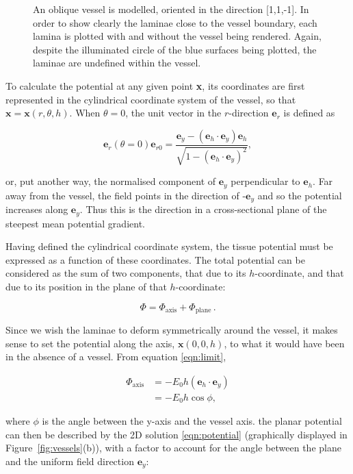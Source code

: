 \begin{figure}[htbp]
    \caption{An oblique vessel is modelled, oriented in the direction [1,1,-1]. In order to show clearly the laminae close to the vessel boundary, each lamina is plotted with and without the vessel being rendered. Again, despite the illuminated circle of the blue surfaces being plotted, the laminae are undefined within the vessel.}
    \label{fig:oblique}
  \end{figure}
  
  To calculate the potential at any given point \textbf{x}, its coordinates are first represented in the cylindrical coordinate system of the vessel, so that $\mathbf{x} = \mathbf{x}(r,\theta,h)$. When $\theta = 0$, the unit vector in the $r$-direction $\mathbf{e}_r$ is defined as
  
  \begin{equation}
    \mathbf{e}_r(\theta = 0) \mathbf{e}_{r0} = \frac{\mathbf{e}_y - (\mathbf{e}_h \cdot \mathbf{e}_y) \mathbf{e}_h}{\sqrt{1 - \left(\mathbf{e}_h \cdot \mathbf{e}_y\right)^2}},
  \end{equation}
  
  or, put another way, the normalised component of $\mathbf{e}_y$ perpendicular to $\mathbf{e}_h$. Far away from the vessel, the field points in the direction of -$\mathbf{e}_y$ and so the potential increases along $\mathbf{e}_y$. Thus this is the direction in a cross-sectional plane of the steepest mean potential gradient.
  
  Having defined the cylindrical coordinate system, the tissue potential must be expressed as a function of these coordinates. The total potential can be considered as the sum of two components, that due to its $h$-coordinate, and that due to its position in the plane of that $h$-coordinate:
  
  \begin{equation}
    \Phi = \Phi_{\text{axis}} + \Phi_{\text{plane}}\,.
  \end{equation}
  
  Since we wish the laminae to deform symmetrically around the vessel, it makes sense to set the potential along the axis, $\mathbf{x}(0,0,h)$, to what it would have been in the absence of a vessel. From equation \ref{eqn:limit},
  
  \begin{align}
    \Phi_{\text{axis}} & = -E_0h(\mathbf{e}_h \cdot \mathbf{e}_y) \\
    & = -E_0h\cos\phi,
  \end{align}
  
  where $\phi$ is the angle between the y-axis and the vessel axis. the planar potential can then be described by the 2D solution \ref{eqn:potential} (graphically displayed in Figure~\ref{fig:vessels}(b)), with a factor to account for the angle between the plane and the uniform field direction $\mathbf{e}_y$:
  
